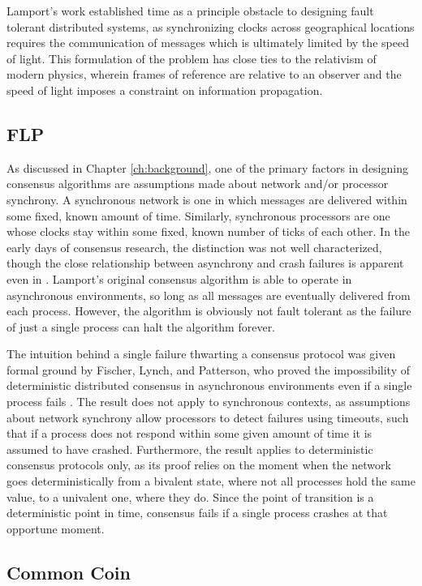Lamport's work established time as a principle obstacle to designing fault tolerant distributed systems,
as synchronizing clocks across geographical locations requires the communication of messages 
which is ultimately limited by the speed of light.
This formulation of the problem has close ties to the relativism of modern physics,
wherein frames of reference are relative to an observer and the speed of light imposes a constraint on information propagation.

\subsection{FLP}
As discussed in Chapter \ref{ch:background}, 
one of the primary factors in designing consensus algorithms are assumptions made about 
network and/or processor synchrony. 
A synchronous network is one in which messages are delivered within some fixed, 
known amount of time. 
Similarly, synchronous processors are one whose clocks stay within some fixed, 
known number of ticks of each other.
In the early days of consensus research, the distinction was not well characterized, 
though the close relationship between asynchrony and crash failures is apparent even in \cite{clocks}.
Lamport's original consensus algorithm is able to operate in asynchronous environments, 
so long as all messages are eventually delivered from each process.
However, the algorithm is obviously not fault tolerant as the failure of just a single process can halt the algorithm forever.

The intuition behind a single failure thwarting a consensus protocol was given formal ground by Fischer, Lynch, and Patterson,
who proved the impossibility of deterministic distributed consensus in asynchronous environments even if a single process fails \cite{flp}.
The result does not apply to synchronous contexts, 
as assumptions about network synchrony allow processors to detect failures using timeouts, 
such that if a process does not respond within some given amount of time it is assumed to have crashed.
Furthermore, the result applies to deterministic consensus protocols only, 
as its proof relies on the moment when the network goes deterministically from a bivalent state, 
where not all processes hold the same value, to a univalent one, where they do.
Since the point of transition is a deterministic point in time, 
consensus fails if a single process crashes at that opportune moment.

\subsection{Common Coin}

